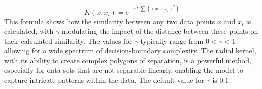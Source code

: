 \[K(x, x_i)=e^{-\gamma*\sum((x-x_i)^2)}\] This formula shows how
the similarity between any two data points \(x\) and \(x_i\) is
calculated, with \(\gamma\) modulating the impact of the distance
between these points on their calculated similarity. The values for
\(\gamma\) typically range from \(0<\gamma<1\) allowing for a wide
spectrum of decision-boundary complexity. The radial kernel, with its
ability to create complex polygons of separation, is a
powerful method, especially for data sets that are not
separable linearly, enabling the model to capture intricate patterns within the
data. The default value for \(\gamma\) is \(0.1\).

\begin{Shaded}
\begin{Highlighting}[]

\OtherTok{\textless{}{-}} \SpecialCharTok{\textasciitilde{}} \NormalTok{, } \NormalTok{)}

\OtherTok{\textless{}{-}} 

\SpecialCharTok{$}
\end{Highlighting}
\end{Shaded}

